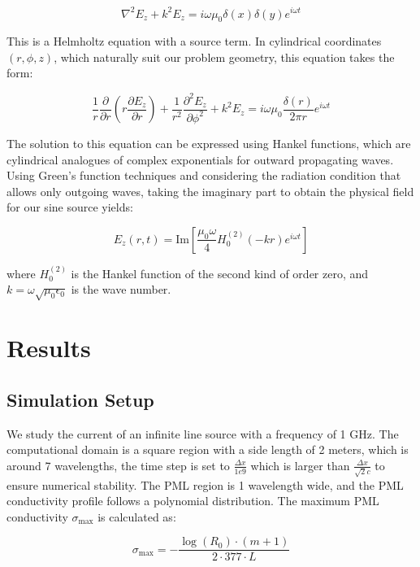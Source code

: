\documentclass[journal]{IEEEtran}
\begin{document}
\begin{equation}
\nabla^2 E_z + k^2 E_z = i\omega\mu_0\delta(x)\delta(y)e^{i\omega t}
\end{equation}

This is a Helmholtz equation with a source term. In cylindrical coordinates $(r,\phi,z)$, which naturally suit our problem geometry, this equation takes the form:

\begin{equation}
\frac{1}{r}\frac{\partial}{\partial r}\left(r\frac{\partial E_z}{\partial r}\right) + \frac{1}{r^2}\frac{\partial^2 E_z}{\partial \phi^2} + k^2 E_z = i\omega\mu_0\frac{\delta(r)}{2\pi r}e^{i\omega t}
\end{equation}

The solution to this equation can be expressed using Hankel functions, which are cylindrical analogues of complex exponentials for outward propagating waves. Using Green's function techniques and 
considering the radiation condition that allows only outgoing waves, taking the imaginary part to obtain the physical field for our sine source yields:

\begin{equation}
E_z(r,t) = \text{Im}\left[\frac{\mu_0 \omega}{4}H_0^{(2)}(-kr)e^{i\omega t}\right]
\end{equation}

where $H_0^{(2)}$ is the Hankel function of the second kind of order zero, and $k = \omega\sqrt{\mu_0\epsilon_0}$ is the wave number. 




\section{Results}
\subsection{Simulation Setup}
We study the current of an infinite line source with a frequency of 1 GHz. The computational domain is a square region with a side length 
of 2 meters, which is around 7 wavelengths, the time step is set to $\frac{\Delta x}{1e9} $ which is larger than $\frac{\Delta x}{\sqrt{2}c}$ to
ensure numerical stability.
The PML region is 1 wavelength wide, and the PML conductivity profile follows a polynomial distribution. 
The maximum PML conductivity $\sigma_{\max}$ is calculated as:

\begin{equation}
\sigma_{\max} = -\frac{\log(R_0) \cdot (m+1)}{2 \cdot 377 \cdot L}
\end{equation}
\end{document}
